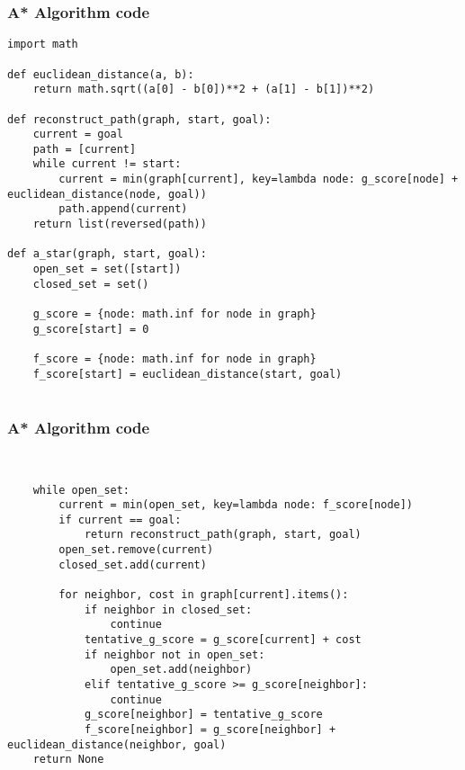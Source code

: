 \begin{frame}[fragile]\frametitle{A* Algorithm code}
{\tiny
\begin{lstlisting}
import math

def euclidean_distance(a, b):
    return math.sqrt((a[0] - b[0])**2 + (a[1] - b[1])**2)

def reconstruct_path(graph, start, goal):
    current = goal
    path = [current]
    while current != start:
        current = min(graph[current], key=lambda node: g_score[node] + euclidean_distance(node, goal))
        path.append(current)
    return list(reversed(path))
	
def a_star(graph, start, goal):
    open_set = set([start])
    closed_set = set()
    
    g_score = {node: math.inf for node in graph}
    g_score[start] = 0
    
    f_score = {node: math.inf for node in graph}
    f_score[start] = euclidean_distance(start, goal)
	
\end{lstlisting}
}
\end{frame}


\begin{frame}[fragile]\frametitle{A* Algorithm code}
{\tiny
\begin{lstlisting}

    
    while open_set:
        current = min(open_set, key=lambda node: f_score[node])
        if current == goal:
            return reconstruct_path(graph, start, goal)
        open_set.remove(current)
        closed_set.add(current)
        
        for neighbor, cost in graph[current].items():
            if neighbor in closed_set:
                continue
            tentative_g_score = g_score[current] + cost
            if neighbor not in open_set:
                open_set.add(neighbor)
            elif tentative_g_score >= g_score[neighbor]:
                continue
            g_score[neighbor] = tentative_g_score
            f_score[neighbor] = g_score[neighbor] + euclidean_distance(neighbor, goal)
    return None
\end{lstlisting}
}
\end{frame}


